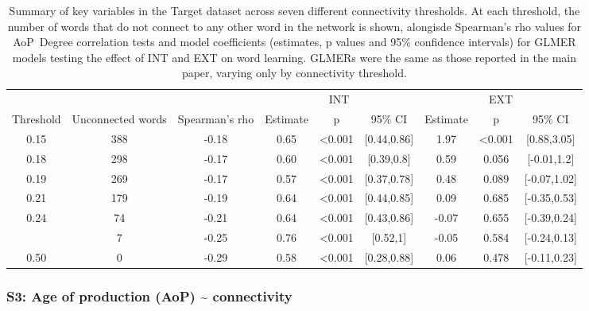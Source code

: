 \documentclass[
  man,floatsintext]{apa6}
\begin{document}
\begin{longtable}[t]{ccccccccc}
\caption{\label{tab:table-thresholdtest-target}Summary of key variables in the Target dataset across seven different connectivity thresholds. At each threshold, the number of words that do not connect to any other word in the network is shown, alongisde Spearman's rho values for AoP~Degree correlation tests and model coefficients (estimates, p values and 95\% confidence intervals) for GLMER models testing the effect of INT and EXT on word learning. GLMERs were the same as those reported in the main paper, varying only by connectivity threshold.}\\
\toprule
\multicolumn{3}{c}{ } & \multicolumn{3}{c}{INT} & \multicolumn{3}{c}{EXT} \\
\cmidrule(l{3pt}r{3pt}){4-6} \cmidrule(l{3pt}r{3pt}){7-9}
Threshold & Unconnected words & Spearman's rho & Estimate & p & 95\% CI & Estimate & p & 95\% CI\\
\midrule
0.15 & 388 & -0.18 & 0.65 & <0.001 & {}[0.44,0.86] & 1.97 & <0.001 & {}[0.88,3.05]\\
0.18 & 298 & -0.17 & 0.60 & <0.001 & {}[0.39,0.8] & 0.59 & 0.056 & {}[-0.01,1.2]\\
0.19 & 269 & -0.17 & 0.57 & <0.001 & {}[0.37,0.78] & 0.48 & 0.089 & {}[-0.07,1.02]\\
0.21 & 179 & -0.19 & 0.64 & <0.001 & {}[0.44,0.85] & 0.09 & 0.685 & {}[-0.35,0.53]\\
0.24 & 74 & -0.21 & 0.64 & <0.001 & {}[0.43,0.86] & -0.07 & 0.655 & {}[-0.39,0.24]\\
\addlinespace
0.34 & 7 & -0.25 & 0.76 & <0.001 & {}[0.52,1] & -0.05 & 0.584 & {}[-0.24,0.13]\\
0.50 & 0 & -0.29 & 0.58 & <0.001 & {}[0.28,0.88] & 0.06 & 0.478 & {}[-0.11,0.23]\\
\bottomrule
\end{longtable}
\endgroup{}

\newpage

\hypertarget{s3-age-of-production-aop-connectivity}{%
\subsubsection{S3: Age of production (AoP) \textasciitilde{} connectivity}\label{s3-age-of-production-aop-connectivity}}
\end{document}
